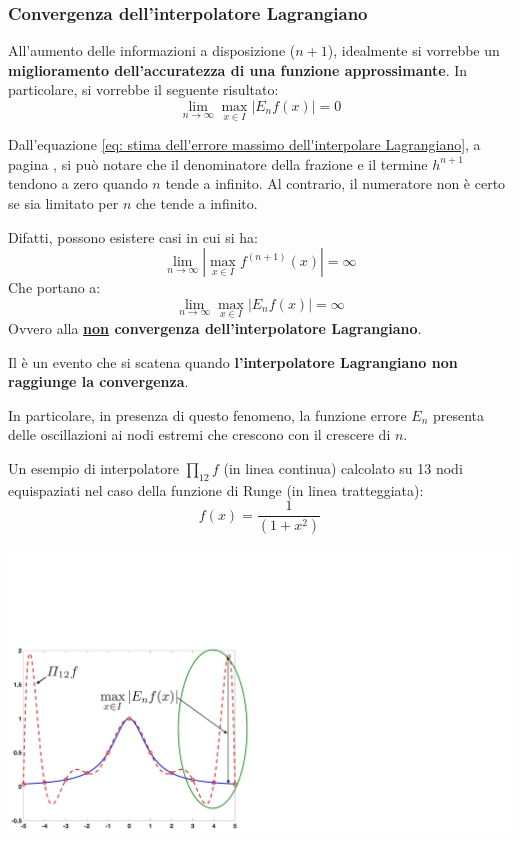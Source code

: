 \newpage

\subsubsection{Convergenza dell'interpolatore Lagrangiano}

All'aumento delle informazioni a disposizione ($n+1$), idealmente si vorrebbe un \textbf{miglioramento dell'accuratezza di una funzione approssimante}. In particolare, si vorrebbe il seguente risultato:
\begin{equation*}
	\lim\limits_{n \rightarrow \infty} \underset{x \in I}{\max} \left|E_{n}f\left(x\right)\right| = 0
\end{equation*}

\highspace
Dall'equazione \ref{eq: stima dell'errore massimo dell'interpolare Lagrangiano}, a pagina \pageref{eq: stima dell'errore massimo dell'interpolare Lagrangiano}, si può notare che il denominatore della frazione e il termine $h^{n+1}$ tendono a zero quando $n$ tende a infinito. Al contrario, il numeratore non è certo se sia limitato per $n$ che tende a infinito.

\highspace
Difatti, possono esistere casi in cui si ha:
\begin{equation*}
	\lim\limits_{n \rightarrow \infty} \left|\underset{x \in I}{\max} f^{\left(n+1\right)}\left(x\right)\right| = \infty
\end{equation*}
Che portano a:
\begin{equation*}
	\lim\limits_{n \rightarrow \infty} \underset{x \in I}{\max} \left|E_{n} f\left(x\right)\right| = \infty
\end{equation*}
Ovvero alla \textbf{\underline{non} convergenza dell'interpolatore Lagrangiano}.

\begin{examplebox}
	Il  è un evento che si scatena quando \textbf{l'interpolatore Lagrangiano non raggiunge la convergenza}.
	
	In particolare, in presenza di questo fenomeno, la funzione errore $E_{n}$ presenta delle oscillazioni ai nodi estremi che crescono con il crescere di $n$.
	
	Un esempio di interpolatore $\prod_{12} f$ (in linea continua) calcolato su 13 nodi equispaziati nel caso della funzione di Runge (in linea tratteggiata):
	\begin{equation*}
		f\left(x\right) = \dfrac{1}{\left(1+x^{2}\right)}
	\end{equation*}
	\begin{center}
		\includegraphics[width=.7\textwidth]{img/fenomeno-di-runge-1.pdf}
	\end{center}
\end{examplebox}